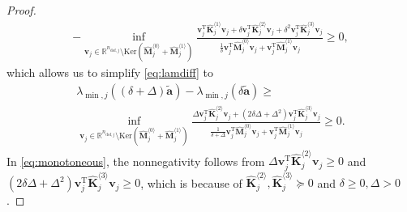 \documentclass[10pt,a4paper]{amsart}
\begin{document}
\begin{proposition}
\begin{proof}
\begin{multline}
	- \inf_{\mathbf{v}_j \in \mathbb{R}^{n_{\mathrm{dof},j}}\setminus \mathrm{Ker}\left(\hat{\mathbf{M}}_j^{\langle 0\rangle}+\hat{\mathbf{M}}_j^{\langle 1\rangle}\right)} \frac{\mathbf{v}_j^\mathrm{T} \hat{\mathbf{K}}_j^{\langle 1\rangle}\mathbf{v}_j + \delta \mathbf{v}_j^\mathrm{T}\hat{\mathbf{K}}_j^{\langle 2\rangle} \mathbf{v}_j + \delta^2 \mathbf{v}_j^\mathrm{T}\hat{\mathbf{K}}_j^{\langle 3\rangle} \mathbf{v}_j}{\frac{1}{\delta}\mathbf{v}_j^\mathrm{T} \hat{\mathbf{M}}_j^{\langle 0\rangle} \mathbf{v}_j + \mathbf{v}_j^\mathrm{T} \hat{\mathbf{M}}_j^{\langle 1\rangle} \mathbf{v}_j} \ge 0,
\end{multline}
%
which allows us to simplify \eqref{eq:lamdiff} to
%
\begin{equation}\label{eq:monotoneous}
\begin{multlined}
\lambda_{\min,j}((\delta + \Delta)\tilde{\mathbf{a}}) - \lambda_{\min,j}(\delta \tilde{\mathbf{a}}) \ge\\
 \inf_{\mathbf{v}_j \in \mathbb{R}^{n_{\mathrm{dof},j}}\setminus \mathrm{Ker}\left(\hat{\mathbf{M}}_j^{\langle 0\rangle}+\hat{\mathbf{M}}_j^{\langle 1\rangle}\right)} 
\frac{\Delta \mathbf{v}_j^\mathrm{T}\hat{\mathbf{K}}_j^{\langle 2\rangle} \mathbf{v}_j + (2\delta \Delta + \Delta^2) \mathbf{v}_j^\mathrm{T}\hat{\mathbf{K}}_j^{\langle 3\rangle} \mathbf{v}_j}{\frac{1}{\delta + \Delta}\mathbf{v}_j^\mathrm{T} \hat{\mathbf{M}}_j^{\langle 0\rangle} \mathbf{v}_j + \mathbf{v}_j^\mathrm{T} \hat{\mathbf{M}}_j^{\langle 1\rangle} \mathbf{v}_j} \ge 0.
\end{multlined}
\end{equation}
%
In \eqref{eq:monotoneous}, the nonnegativity follows from $\Delta \mathbf{v}_j^\mathrm{T}\hat{\mathbf{K}}_j^{\langle 2\rangle} \mathbf{v}_j \ge 0$ and $\left(2\delta \Delta + \Delta^2\right) \mathbf{v}_j^\mathrm{T}\hat{\mathbf{K}}_j^{\langle 3\rangle} \mathbf{v}_j\ge 0$, which is because of $\hat{\mathbf{K}}_j^{\langle 2\rangle}, \hat{\mathbf{K}}_j^{\langle 3\rangle} \succeq 0$ and $\delta\ge 0, \Delta > 0$.
\end{proof}
\end{proposition}
\end{document}
